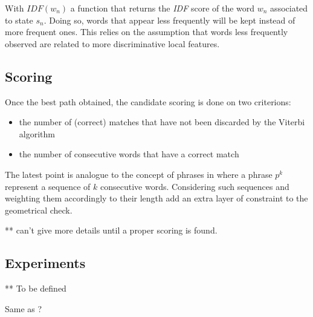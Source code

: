 With $IDF(w_n)$ a function that returns the \textit{IDF} score of the word $w_n$ associated to state $s_n$.
Doing so, words that appear less frequently will be kept instead of more frequent ones. This relies on the assumption that words less frequently observed are related to more discriminative local features.

\begin{figure}[H]
\end{figure}

\subsection{Scoring}
\label{sec:viterbiscore}

Once the best path obtained, the candidate scoring is done on two criterions:
\begin{itemize}
\item the number of (correct) matches that have not been discarded by the Viterbi algorithm
\item the number of consecutive words that have a correct match
\end{itemize}

The latest point is analogue to the concept of phrases in \cite{TipaldiGFLIP} where a phrase $p^k$ represent a sequence of $k$ consecutive words. Considering such sequences and weighting them accordingly to their length add an extra layer of constraint to the geometrical check.

** can't give more details until a proper scoring is found.

\subsection{Experiments}
\label{sec:exp}

** To be defined

Same as \cite{TipaldiGFLIP} ? 